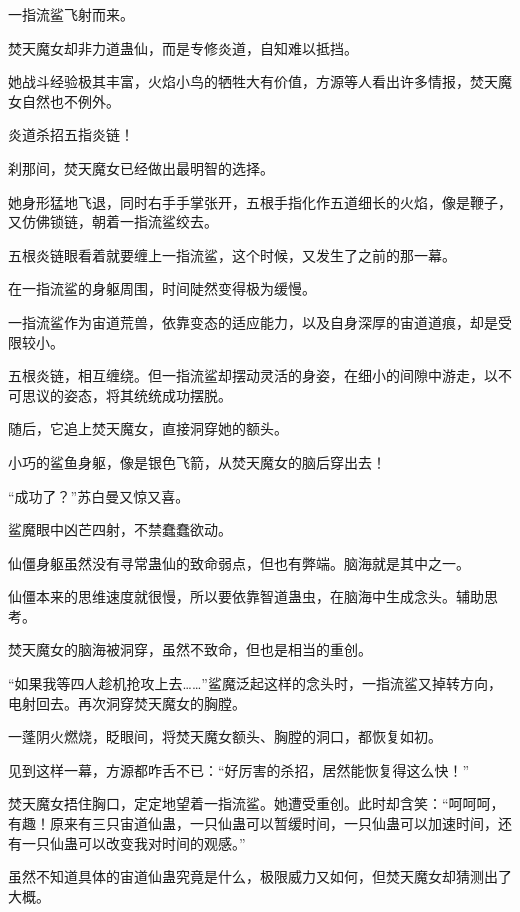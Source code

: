 
\begin{this_body}



一指流鲨飞射而来。

焚天魔女却非力道蛊仙，而是专修炎道，自知难以抵挡。

她战斗经验极其丰富，火焰小鸟的牺牲大有价值，方源等人看出许多情报，焚天魔女自然也不例外。

炎道杀招五指炎链！

刹那间，焚天魔女已经做出最明智的选择。

她身形猛地飞退，同时右手手掌张开，五根手指化作五道细长的火焰，像是鞭子，又仿佛锁链，朝着一指流鲨绞去。

五根炎链眼看着就要缠上一指流鲨，这个时候，又发生了之前的那一幕。

在一指流鲨的身躯周围，时间陡然变得极为缓慢。

一指流鲨作为宙道荒兽，依靠变态的适应能力，以及自身深厚的宙道道痕，却是受限较小。

五根炎链，相互缠绕。但一指流鲨却摆动灵活的身姿，在细小的间隙中游走，以不可思议的姿态，将其统统成功摆脱。

随后，它追上焚天魔女，直接洞穿她的额头。

小巧的鲨鱼身躯，像是银色飞箭，从焚天魔女的脑后穿出去！

“成功了？”苏白曼又惊又喜。

鲨魔眼中凶芒四射，不禁蠢蠢欲动。

仙僵身躯虽然没有寻常蛊仙的致命弱点，但也有弊端。脑海就是其中之一。

仙僵本来的思维速度就很慢，所以要依靠智道蛊虫，在脑海中生成念头。辅助思考。

焚天魔女的脑海被洞穿，虽然不致命，但也是相当的重创。

“如果我等四人趁机抢攻上去……”鲨魔泛起这样的念头时，一指流鲨又掉转方向，电射回去。再次洞穿焚天魔女的胸膛。

一蓬阴火燃烧，眨眼间，将焚天魔女额头、胸膛的洞口，都恢复如初。

见到这样一幕，方源都咋舌不已：“好厉害的杀招，居然能恢复得这么快！”

焚天魔女捂住胸口，定定地望着一指流鲨。她遭受重创。此时却含笑：“呵呵呵，有趣！原来有三只宙道仙蛊，一只仙蛊可以暂缓时间，一只仙蛊可以加速时间，还有一只仙蛊可以改变我对时间的观感。”

虽然不知道具体的宙道仙蛊究竟是什么，极限威力又如何，但焚天魔女却猜测出了大概。


\end{this_body}
